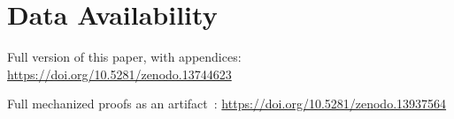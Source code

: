 \documentclass[acmsmall,screen]{acmart}
\begin{document}
\section*{Data Availability}
Full version of this paper, with appendices: \url{https://doi.org/10.5281/zenodo.13744623}

\noindent Full mechanized proofs as an artifact~\citep*{artifact}: \url{https://doi.org/10.5281/zenodo.13937564}







\begin{version}{\Appendices}
\clearpage
\appendix

\begin{version}{\FALSE}

\end{version}




\end{version}
\end{document}
